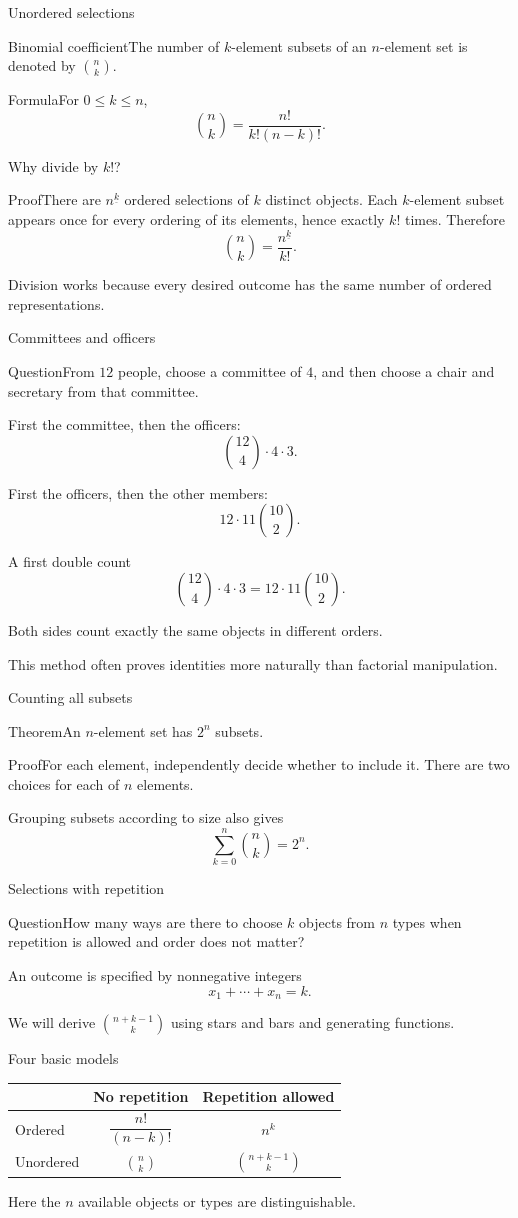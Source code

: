 \documentclass[aspectratio=169,11pt]{beamer}
\newcommand{\Def}[2]{\begin{block}{#1}#2\end{block}}
\newcommand{\Thm}[2]{\begin{block}{#1}#2\end{block}}
\renewcommand{\Proof}[1]{\begin{block}{Proof}\normalsize #1\end{block}}
\newcommand{\Question}[1]{\begin{block}{Question}#1\end{block}}
\newcommand{\fall}[2]{#1^{\underline{#2}}}
\newcommand{\gap}{\par\medskip}
\begin{document}
\begin{frame}{Unordered selections}
\large
\Def{Binomial coefficient}{The number of $k$-element subsets of an $n$-element set is denoted by $\binom nk$.}
\Thm{Formula}{For $0\leq k\leq n$,
\[\binom nk=\frac{n!}{k!(n-k)!}.\]}
\end{frame}
\begin{frame}{Why divide by $k!$?}
\large
\Proof{There are $\fall nk$ ordered selections of $k$ distinct objects. Each $k$-element subset appears once for every ordering of its elements, hence exactly $k!$ times. Therefore
\[\binom nk=\frac{\fall nk}{k!}.\]}
\gap Division works because every desired outcome has the same number of ordered representations.
\end{frame}
\begin{frame}{Committees and officers}
\large
\Question{From $12$ people, choose a committee of $4$, and then choose a chair and secretary from that committee.}
\gap First the committee, then the officers:
\[\binom{12}{4}\cdot4\cdot3.\]
\gap First the officers, then the other members:
\[12\cdot11\binom{10}{2}.\]
\end{frame}
\begin{frame}{A first double count}
\large
\[\binom{12}{4}\cdot4\cdot3=12\cdot11\binom{10}{2}.\]
\gap Both sides count exactly the same objects in different orders.
\gap This method often proves identities more naturally than factorial manipulation.
\end{frame}
\begin{frame}{Counting all subsets}
\large
\Thm{Theorem}{An $n$-element set has $2^n$ subsets.}
\Proof{For each element, independently decide whether to include it. There are two choices for each of $n$ elements.}
\gap Grouping subsets according to size also gives
\[\sum_{k=0}^n\binom nk=2^n.\]
\end{frame}
\begin{frame}{Selections with repetition}
\large
\Question{How many ways are there to choose $k$ objects from $n$ types when repetition is allowed and order does not matter?}
\gap An outcome is specified by nonnegative integers
\[x_1+\cdots+x_n=k.\]
\gap We will derive $\binom{n+k-1}{k}$ using stars and bars and generating functions.
\end{frame}
\begin{frame}{Four basic models}
\large
\begin{center}\renewcommand{\arraystretch}{1.65}
\begin{tabular}{lcc}
& No repetition & Repetition allowed\\\hline
Ordered & $\dfrac{n!}{(n-k)!}$ & $n^k$\\
Unordered & $\binom nk$ & $\binom{n+k-1}{k}$
\end{tabular}\end{center}
\gap Here the $n$ available objects or types are distinguishable.
\end{frame}
\end{document}
